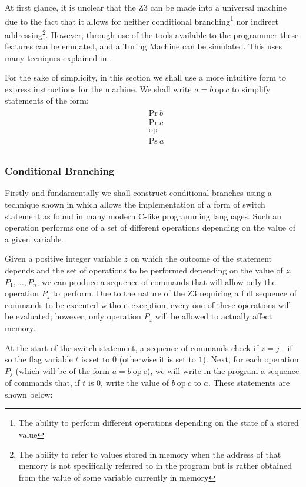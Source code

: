 \documentclass[Master.tex]{subfiles}
\begin{document}
At first glance, it is unclear that the Z3 can be made into a universal machine due to the fact that it allows for neither conditional branching\footnote{The ability to perform different operations depending on the state of a stored value} nor indirect addressing\footnote{The ability to refer to values stored in memory when the address of that memory is not specifically referred to in the program but is rather obtained from the value of some variable currently in memory}. However, through use of the tools available to the programmer these features can be emulated, and a Turing Machine can be simulated. This uses many tecniques explained in \cite{rojas1998z3universal}.

For the sake of simplicity, in this section we shall use a more intuitive form to express instructions for the machine. We shall write $a = b\ \mathrm{op}\ c$ to simplify statements of the form:
\begin{gather*}
\begin{aligned}
&\mathrm{Pr}\ b\\
&\mathrm{Pr}\ c\\
&\textrm{op}\\ 
&\mathrm{Ps}\ a\\
\end{aligned}
\end{gather*}

\subsubsection{Conditional Branching}

Firstly and fundamentally we shall construct conditional branches using a technique shown in \cite{ibarra1983control} which allows the implementation of a form of switch statement as found in many modern C-like programming languages. Such an operation performs one of a set of different operations depending on the value of a given variable.

Given a positive integer variable $z$ on which the outcome of the statement depends and the set of operations to be performed depending on the value of $z$, $P_1, ... , P_n$, we can produce a sequence of commands that will allow only the operation $P_z$ to perform. Due to the nature of the Z3 requiring a full sequence of commands to be executed without exception, every one of these operations will be evaluated; however, only operation $P_z$ will be allowed to actually affect memory.


At the start of the switch statement, a sequence of commands check if $z = j$ - if so the flag variable $t$ is set to $0$ (otherwise it is set to $1$). Next, for each operation $P_j$ (which will be of the form $a = b\ \mathrm{op}\ c$), we will write in the program a sequence of commands that, if $t$ is $0$, write the value of $b\ \mathrm{op}\ c$ to $a$. These statements are shown below:
\end{document}
